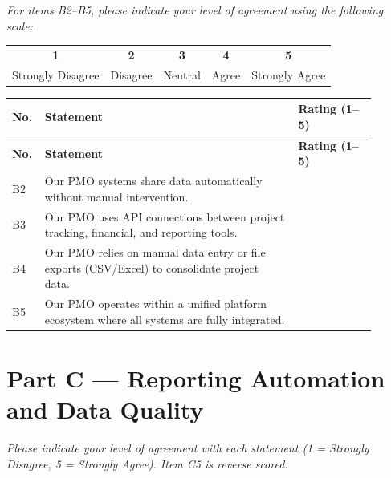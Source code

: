\bigskip
\noindent\textit{For items B2--B5, please indicate your level of agreement
using the following scale:}

\medskip
\begin{center}
\begin{tabular}{ccccc}
  \textbf{1} & \textbf{2} & \textbf{3} & \textbf{4} & \textbf{5}\\
  Strongly Disagree & Disagree & Neutral & Agree & Strongly Agree
\end{tabular}
\end{center}

\bigskip

{\singlespacing
\begin{longtable}{@{} p{0.05\linewidth} p{0.65\linewidth} p{0.20\linewidth} @{}}
\toprule
\textbf{No.} & \textbf{Statement} & \textbf{Rating (1--5)}\\
\midrule
\endfirsthead
\toprule
\textbf{No.} & \textbf{Statement} & \textbf{Rating (1--5)}\\
\midrule
\endhead
\bottomrule
\endfoot
B2 & Our PMO systems share data automatically without manual intervention.
   & \underline{\hspace{2cm}}\\[6pt]
B3 & Our PMO uses API connections between project tracking, financial, and
   reporting tools.
   & \underline{\hspace{2cm}}\\[6pt]
B4 & Our PMO relies on manual data entry or file exports (CSV/Excel) to
   consolidate project data.
   & \underline{\hspace{2cm}}\\[6pt]
B5 & Our PMO operates within a unified platform ecosystem where all systems
   are fully integrated.
   & \underline{\hspace{2cm}}\\
\end{longtable}
}

\section*{Part C --- Reporting Automation and Data Quality}

\noindent\textit{Please indicate your level of agreement with each statement
(1 = Strongly Disagree, 5 = Strongly Agree). Item C5 is reverse scored.}

\bigskip

